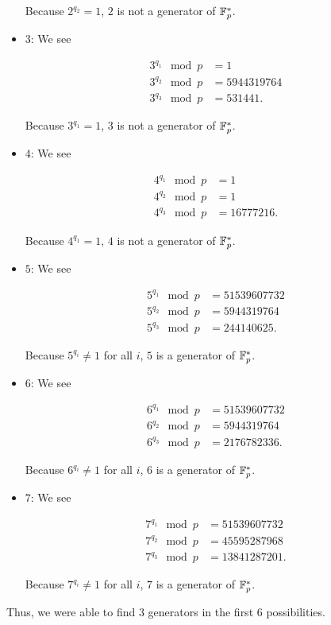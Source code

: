 \begin{example}
\begin{itemize}
\noindent
Because $2^{q_{2}} = 1$, $2$ is not a generator of $\mathbb{F}_{p}^{*}$.

\item $3$: We see

\begin{align}
    3^{q_{1}} \mod p &= 1
        \nonumber\\
    3^{q_{2}} \mod p &= 5944319764
        \nonumber\\
    3^{q_{3}} \mod p &= 531441.
\end{align}

\noindent
Because $3^{q_{1}} = 1$, $3$ is not a generator of $\mathbb{F}_{p}^{*}$.

\item $4$: We see

\begin{align}
    4^{q_{1}} \mod p &= 1
        \nonumber\\
    4^{q_{2}} \mod p &= 1
        \nonumber\\
    4^{q_{3}} \mod p &= 16777216.
\end{align}

\noindent
Because $4^{q_{1}} = 1$, $4$ is not a generator of $\mathbb{F}_{p}^{*}$.

\item $5$: We see

\begin{align}
    5^{q_{1}} \mod p &= 51539607732
        \nonumber\\
    5^{q_{2}} \mod p &= 5944319764
        \nonumber\\
    5^{q_{3}} \mod p &= 244140625.
\end{align}

\noindent
Because $5^{q_{i}} \ne 1$ for all $i$, $5$ is a generator of $\mathbb{F}_{p}^{*}$.

\item $6$: We see

\begin{align}
    6^{q_{1}} \mod p &= 51539607732
        \nonumber\\
    6^{q_{2}} \mod p &= 5944319764
        \nonumber\\
    6^{q_{3}} \mod p &= 2176782336.
\end{align}

\noindent
Because $6^{q_{i}} \ne 1$ for all $i$, $6$ is a generator of $\mathbb{F}_{p}^{*}$.

\item $7$: We see

\begin{align}
    7^{q_{1}} \mod p &= 51539607732
        \nonumber\\
    7^{q_{2}} \mod p &= 45595287968
        \nonumber\\
    7^{q_{3}} \mod p &= 13841287201.
\end{align}

\noindent
Because $7^{q_{i}} \ne 1$ for all $i$, $7$ is a generator of $\mathbb{F}_{p}^{*}$.
\end{itemize}

Thus, we were able to find 3 generators in the first 6 possibilities.
\end{example}

